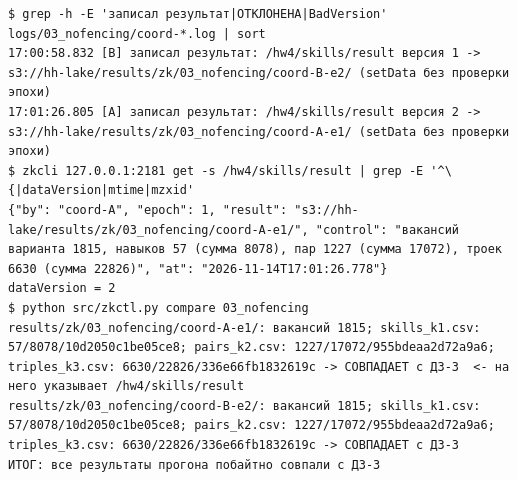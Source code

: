 \begin{Verbatim}
$ grep -h -E 'записал результат|ОТКЛОНЕНА|BadVersion' logs/03_nofencing/coord-*.log | sort
17:00:58.832 [B] записал результат: /hw4/skills/result версия 1 -> s3://hh-lake/results/zk/03_nofencing/coord-B-e2/ (setData без проверки эпохи)
17:01:26.805 [A] записал результат: /hw4/skills/result версия 2 -> s3://hh-lake/results/zk/03_nofencing/coord-A-e1/ (setData без проверки эпохи)
$ zkcli 127.0.0.1:2181 get -s /hw4/skills/result | grep -E '^\{|dataVersion|mtime|mzxid'
{"by": "coord-A", "epoch": 1, "result": "s3://hh-lake/results/zk/03_nofencing/coord-A-e1/", "control": "вакансий варианта 1815, навыков 57 (сумма 8078), пар 1227 (сумма 17072), троек 6630 (сумма 22826)", "at": "2026-11-14T17:01:26.778"}
dataVersion = 2
$ python src/zkctl.py compare 03_nofencing
results/zk/03_nofencing/coord-A-e1/: вакансий 1815; skills_k1.csv: 57/8078/10d2050c1be05ce8; pairs_k2.csv: 1227/17072/955bdeaa2d72a9a6; triples_k3.csv: 6630/22826/336e66fb1832619c -> СОВПАДАЕТ с ДЗ-3  <- на него указывает /hw4/skills/result
results/zk/03_nofencing/coord-B-e2/: вакансий 1815; skills_k1.csv: 57/8078/10d2050c1be05ce8; pairs_k2.csv: 1227/17072/955bdeaa2d72a9a6; triples_k3.csv: 6630/22826/336e66fb1832619c -> СОВПАДАЕТ с ДЗ-3
ИТОГ: все результаты прогона побайтно совпали с ДЗ-3
\end{Verbatim}
